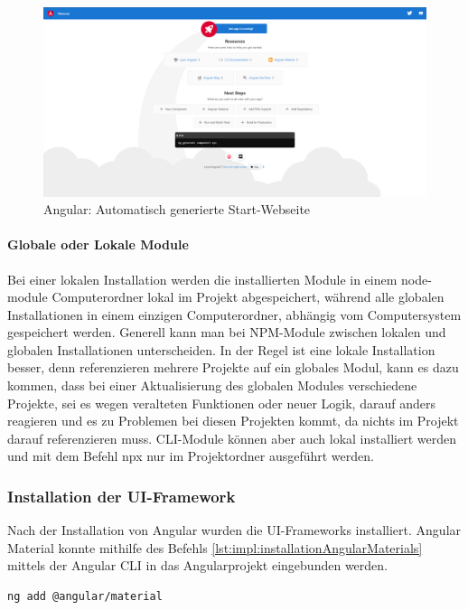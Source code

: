 \begin{figure}
    \centering
    \includegraphics[scale=0.25]{pics/AngularStartingPage.png}
    \caption{Angular: Automatisch generierte Start-Webseite}
    \label{fig:impl:angular-starting-page}
\end{figure}

\paragraph{Globale oder Lokale Module}
Bei einer lokalen Installation werden die installierten Module in einem node-module Computerordner lokal im Projekt abgespeichert, während alle globalen Installationen in einem einzigen Computerordner, abhängig vom Computersystem gespeichert werden.
Generell kann man bei NPM-Module zwischen lokalen und globalen Installationen unterscheiden. In der Regel ist eine lokale Installation besser, denn referenzieren mehrere Projekte auf ein globales Modul, kann es dazu kommen, dass bei einer Aktualisierung des globalen Modules verschiedene Projekte, sei es wegen veralteten Funktionen oder neuer Logik, darauf anders reagieren und es zu Problemen bei diesen Projekten kommt, da nichts im Projekt darauf referenzieren muss. 
CLI-Module können aber auch lokal installiert werden und mit dem Befehl npx nur im Projektordner ausgeführt  werden. 
\cite{npmlocalorglobal}

\subsubsection{Installation der UI-Framework}

Nach der Installation von Angular wurden die UI-Frameworks installiert. Angular Material konnte mithilfe des Befehls  \ref{lst:impl:installationAngularMaterials} mittels der Angular CLI in das Angularprojekt eingebunden werden.

\begin{lstlisting}[caption={{Terminal - Angular Material Installation}},language=bash,label=lst:impl:installationAngularMaterials]
    ng add @angular/material
\end{lstlisting}


